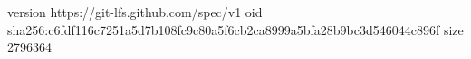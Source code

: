 version https://git-lfs.github.com/spec/v1
oid sha256:c6fdf116c7251a5d7b108fc9c80a5f6cb2ca8999a5bfa28b9bc3d546044c896f
size 2796364
